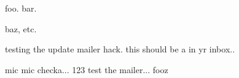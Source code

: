foo. bar.

baz, etc.

testing the update mailer hack.  this should be a \delta in yr inbox..

mic mic checka... 123
test the mailer...
fooz
